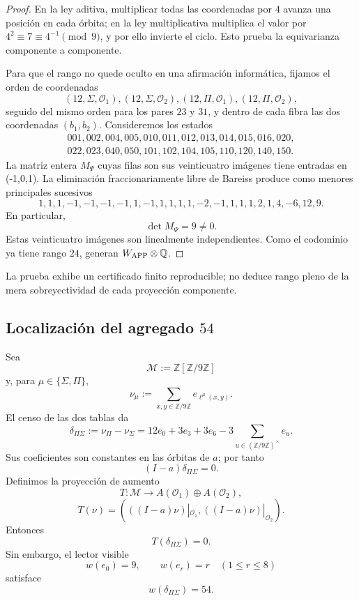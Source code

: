 \begin{proof}
En la ley aditiva, multiplicar todas las coordenadas por \(4\) avanza una
posición en cada órbita; en la ley multiplicativa multiplica el valor por
\(4^2\equiv7\equiv4^{-1}\pmod9\), y por ello invierte el ciclo. Esto prueba
la equivarianza componente a componente.

Para que el rango no quede oculto en una afirmación informática, fijamos el
orden de coordenadas
\[
 (12,\Sigma,\mathcal O_1),(12,\Sigma,\mathcal O_2),
 (12,\Pi,\mathcal O_1),(12,\Pi,\mathcal O_2),
\]
seguido del mismo orden para los pares \(23\) y \(31\), y dentro de cada
fibra las dos coordenadas \((b_1,b_2)\). Consideremos los estados
\[
\begin{gathered}
001,002,004,005,010,011,012,013,014,015,016,020,\\
022,023,040,050,101,102,104,105,110,120,140,150.
\end{gathered}
\]
La matriz entera \(M_\Psi\) cuyas filas son sus veinticuatro imágenes tiene
entradas en ({-1,0,1}). La eliminación fraccionariamente libre de
Bareiss produce como menores principales sucesivos
\[
1,1,1,-1,-1,-1,-1,1,-1,1,1,1,1,-2,-1,1,1,1,2,1,4,-6,12,9.
\]
En particular,
\[
 \det M_\Psi=9\neq0.
\]
Estas veinticuatro imágenes son linealmente independientes. Como el
codominio ya tiene rango \(24\), generan \(W_{\rm APP}\otimes\mathbb Q\).
\end{proof}

La prueba exhibe un certificado finito reproducible; no deduce rango pleno
de la mera sobreyectividad de cada proyección componente.

\subsection{Localización del agregado \texorpdfstring{\(54\)}{54}}

Sea
\[
 \mathcal M:=\mathbb Z[\mathbb Z/9\mathbb Z]
\]
y, para \(\mu\in\{\Sigma,\Pi\}\),
\[
 \nu_\mu:=\sum_{x,y\in\mathbb Z/9\mathbb Z}
 e_{\ell^\mu(x,y)}.
\]
El censo de las dos tablas da
\[
 \delta_{\Pi\Sigma}:=\nu_\Pi-\nu_\Sigma
 =12e_0+3e_3+3e_6
 -3\sum_{u\in(\mathbb Z/9\mathbb Z)^\times}e_u.
\]
Sus coeficientes son constantes en las órbitas de \(a\); por tanto
\[
 (I-a)\delta_{\Pi\Sigma}=0.
\]
Definimos la proyección de aumento
\[
 T:\mathcal M\longrightarrow
 A(\mathcal O_1)\oplus A(\mathcal O_2),
\]
\[
 T(\nu)=
 \left(((I-a)\nu)|_{\mathcal O_1},
       ((I-a)\nu)|_{\mathcal O_2}\right).
\]
Entonces
\[
 T(\delta_{\Pi\Sigma})=0.
\]
Sin embargo, el lector visible
\[
 w(e_0)=9,
 \qquad w(e_r)=r\quad(1\leq r\leq8)
\]
satisface
\[
 w(\delta_{\Pi\Sigma})=54.
\]

